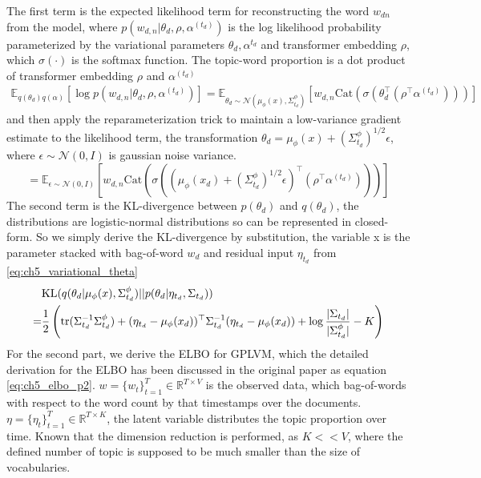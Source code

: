 The first term is the expected likelihood term for reconstructing the word $ w_{dn} $ from the model, where $ p(w_{d,n}|\theta_d, \rho,\alpha^{(t_d)}) $ is the log likelihood probability parameterized by the variational parameters $ \theta_d, \alpha^{t_d} $ and transformer embedding $ \rho $, which $ \sigma(\cdot) $ is the softmax function. The topic-word proportion is a dot product of transformer embedding $ \rho $ and $ \alpha^{(t_d)} $
\begin{align}
\mathbb{E}_{q(\theta_d)q(\alpha)}[\log p(w_{d,n}|\theta_d,\rho,\alpha^{(t_d)})]=\mathbb{E}_{\theta_d\sim\mathcal{N}(\mu_{\phi}(x),\Sigma^{\phi}_{t_d})}[w_{d,n}\text{Cat}\left(\sigma(\theta_d^\top(\rho^\top\alpha^{(t_d)}))\right)]
\end{align}
and then apply the reparameterization trick to maintain a low-variance gradient estimate to the likelihood term, the transformation $ \theta_d=\mu_{\phi}(x)+(\Sigma^{\phi}_{t_d})^{1/2}\epsilon $, where $ \epsilon\sim\mathcal{N}(0,I) $ is gaussian noise variance.
\begin{equation}\label{eq:ch5_reconstruction}
=\mathbb{E}_{\epsilon\sim\mathcal{N}(0,I)}\left[w_{d,n}\text{Cat}\left(\sigma((\mu_{\phi}(x_d)+(\Sigma^{\phi}_{t_d})^{1/2}\epsilon)^\top(\rho^\top\alpha^{(t_d)}))\right)\right]
\end{equation}
The second term is the KL-divergence between $ p(\theta_d) $ and $ q(\theta_d) $, the distributions are logistic-normal distributions so can be represented in closed-form. So we simply derive the KL-divergence by substitution,
the variable x is the parameter stacked with bag-of-word $ w_d $ and residual input $ \eta_{t_d} $ from \ref{eq:ch5_variational_theta}
\begin{align}\label{eq:ch5_kl_theta}
&\text{KL}(q(\theta_d|\mu_{\phi}(x),\Sigma^{\phi}_{t_d})||p(\theta_d|\eta_{t_d},\Sigma_{t_d}))\notag\\
=&\frac{1}{2}\left(\text{tr}(\Sigma_{t_d}^{-1}\Sigma_{t_d}^{\phi})+(\eta_{t_d}-\mu_{\phi}(x_d))^\top\Sigma_{t_d}^{-1}(\eta_{t_d}-\mu_{\phi}(x_d))+\log\frac{|\Sigma_{t_d}|}{|\Sigma^{\phi}_{t_d}|}-K\right)
\end{align}
For the second part, we derive the ELBO for GPLVM, which the detailed derivation for the ELBO has been discussed in the original paper \cite{titsias_bayesian_nodate} as equation \ref{eq:ch5_elbo_p2}. $ w=\{w_t\}^{T}_{t=1}\in\mathbb{R}^{T\times V} $ is the observed data, which bag-of-words with respect to the word count by that timestamps over the documents. $ \eta=\{\eta_t\}^{T}_{t=1}\in\mathbb{R}^{T\times K} $, the latent variable distributes the topic proportion over time. Known that the dimension reduction is performed, as $ K<<V $, where the defined number of topic is supposed to be much smaller than the size of vocabularies.
